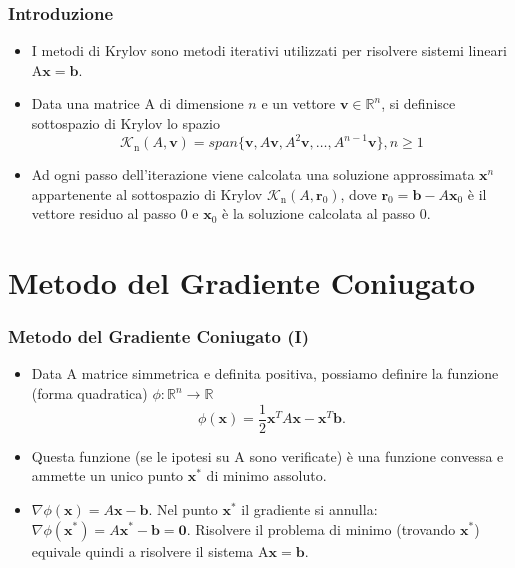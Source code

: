 \documentclass[10pt]{beamer}
\begin{document}
\begin{frame} \frametitle{Introduzione}
\begin{itemize}
    \item I metodi di Krylov sono metodi iterativi utilizzati per risolvere sistemi lineari A$\mathbf{x}=\mathbf{b}$.

    \item Data una matrice A di dimensione $\mathit{n}$ e un vettore $\mathbf{v}\in \mathbb{R}^n$, si definisce \alert{sottospazio di Krylov} lo spazio
    $$
    \mathcal{K}_\mathrm{n}(A,\mathbf{v})=span\{\mathbf{v},A\mathbf{v},A^2\mathbf{v},\dots,A^{n-1}\mathbf{v}\}, n\geq1
    $$

    \item Ad ogni passo dell'iterazione viene calcolata una soluzione approssimata $\mathbf{x}^\mathit{n}$ appartenente al sottospazio di Krylov $\mathcal{K}_\mathrm{n}(A,\mathbf{r}_0)$, dove $\mathbf{r}_0=\mathbf{b}-A\mathbf{x}_0$ è il vettore residuo al passo 0 e $\mathbf{x}_0$ è la soluzione calcolata al passo 0.
    
\end{itemize}
\end{frame}

\section{Metodo del Gradiente Coniugato}\label{sec:sec2}

\begin{frame} \frametitle{Metodo del Gradiente Coniugato (I)}
\begin{itemize}
    \item Data A matrice simmetrica e definita positiva, possiamo definire la funzione (forma quadratica) $\phi:\mathbb{R}^n \to \mathbb{R}$ $$\phi(\mathbf{x})=\frac{1}{2}\mathbf{x}^TA\mathbf{x}-\mathbf{x}^T\mathbf{b}.$$
    
    \item Questa funzione (se le ipotesi su A sono verificate) è una funzione convessa e ammette un unico punto $\mathbf{x}^{\ast}$ di minimo assoluto.
    
    \item $\nabla \phi(\mathbf{x})=A\mathbf{x}-\mathbf{b}$. Nel punto $\mathbf{x}^{\ast}$ il gradiente si annulla:  $\nabla \phi(\mathbf{x}^{\ast})=A\mathbf{x}^{\ast}-\mathbf{b}=\mathbf{0}$.
    Risolvere il problema di minimo (trovando $\mathbf{x}^{\ast}$) equivale quindi a risolvere il sistema A$\mathbf{x}=\mathbf{b}$.

\end{itemize}
\end{frame}
\end{document}
